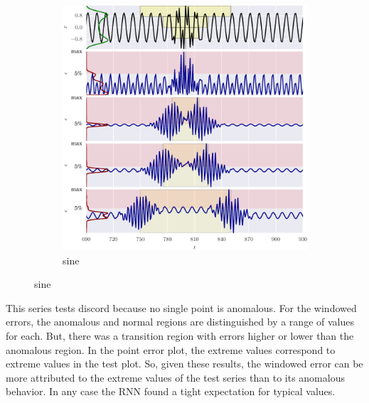 \begin{figure}[H]
    \ContinuedFloat 
  
    \begin{subfigure}[t]{\textwidth}
        \centering
        \includegraphics[]{figs/er_sin.pdf}
        \caption{sine}
    \end{subfigure}%

\end{figure}

This series tests discord because no single point is anomalous.
%
For the windowed errors, the anomalous and normal regions are distinguished by a range of values for each.
%
But, there was a transition region with errors higher or lower than the anomalous region.
%
In the point error plot, the extreme values correspond to extreme values in the test plot.
%
So, given these results, the windowed error can be more attributed to the extreme values of the test series than to its anomalous behavior.
%
In any case the RNN found a tight expectation for typical values.



{} \nopagebreak

